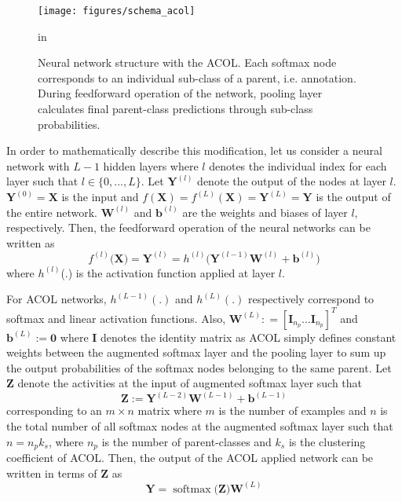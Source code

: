 \documentclass{article} \usepackage{iclr2018_conference,times}
\DeclareMathOperator{\softmax}{softmax}
\begin{document}
\begin{figure}[h]
	\begin{center}
		\centerline{\texttt{[image: figures/schema\_acol]}}
		\caption{Neural network structure with the ACOL. Each softmax node corresponds to an individual sub-class of a parent, i.e. annotation. During feedforward operation of the network, pooling layer calculates final parent-class predictions through sub-class probabilities.}
		\label{fig:pseudo_clustering}
	\end{center}
	 in
\end{figure}

In order to mathematically describe this modification, let us consider a neural network with $L-1$ hidden layers where $l$ denotes the individual index for each layer such that $l \in \{0,...,L\}$. Let $\boldsymbol{Y} ^{(l)}$ denote the output of the nodes at layer $l$. $\boldsymbol{Y} ^{(0)}=\boldsymbol{X}$ is the input and $f(\boldsymbol{X})=f^{(L)}(\boldsymbol{X})=\boldsymbol{Y}^{(L)}=\boldsymbol{Y}$ is the output of the entire network. $\boldsymbol{W} ^{(l)}$ and $\textbf{b}^{(l)}$ are the weights and biases of layer $l$, respectively. Then, the feedforward operation of the neural networks can be written as 
\begin{equation}
\label{eq:pseudo_neuralnetwork}
f^{(l)}\big(\boldsymbol{X}\big) = 
\boldsymbol{Y}^{(l)} = 
h^{(l)}\big(\boldsymbol{Y}^{(l-1)}\boldsymbol{W}^{(l)} + \boldsymbol{b}^{(l)}\big)
\end{equation}
where $h^{(l)}$(.) is the activation function applied at layer $l$. 

For ACOL networks, $h^{(L-1)}(.)$ and $h^{(L)}(.)$ respectively correspond to softmax and linear activation functions. Also, $\boldsymbol{W}^{(L)}: = [\boldsymbol{I}_{n_p} \dots \boldsymbol{I}_{n_p}]^T$ and $\boldsymbol{b}^{(L)} := \boldsymbol{0}$ where $\boldsymbol{I}$ denotes the identity matrix as ACOL simply defines constant weights between the augmented softmax layer and the pooling layer to sum up the output probabilities of the softmax nodes belonging to the same parent. Let $\boldsymbol{Z}$ denote the activities at the input of augmented softmax layer such that 
\begin{equation}
\boldsymbol{Z} := \boldsymbol{Y}^{(L-2)}\boldsymbol{W}^{(L-1)} + \boldsymbol{b}^{(L-1)}
\end{equation} 
corresponding to an $m \times n$ matrix where $m$ is the number of examples and $n$ is the total number of all softmax nodes at the augmented softmax layer such that $n=n_pk_s$, where $n_p$ is the number of parent-classes and $k_s$ is the clustering coefficient of ACOL.
Then, the output of the ACOL applied network can be written in terms of $\boldsymbol{Z}$ as 
\begin{equation}
\boldsymbol{Y} =  
\softmax\big(\boldsymbol{Z}\big)\boldsymbol{W}^{(L)}
\end{equation}
\end{document}
